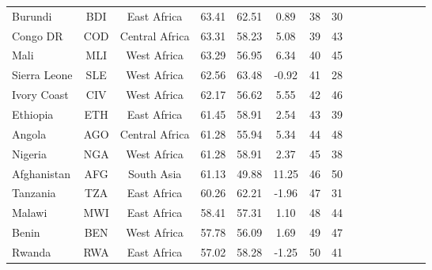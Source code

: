 {\begin{longtable}{lcccccccccccccc}
Burundi                           & BDI           & East Africa        & 63.41             & 62.51               & 0.89               & 38            & 30              \\
Congo DR & COD           & Central Africa     & 63.31             & 58.23               & 5.08               & 39            & 43              \\
Mali                              & MLI           & West Africa        & 63.29             & 56.95               & 6.34               & 40            & 45              \\
Sierra Leone                      & SLE           & West Africa        & 62.56             & 63.48               & -0.92              & 41            & 28              \\
Ivory Coast                    & CIV           & West Africa        & 62.17             & 56.62               & 5.55               & 42            & 46              \\
Ethiopia                          & ETH           & East Africa        & 61.45             & 58.91               & 2.54               & 43            & 39              \\
Angola                            & AGO           & Central Africa     & 61.28             & 55.94               & 5.34               & 44            & 48              \\
Nigeria                           & NGA           & West Africa        & 61.28             & 58.91               & 2.37               & 45            & 38              \\
Afghanistan                       & AFG           & South Asia         & 61.13             & 49.88               & 11.25              & 46            & 50              \\
Tanzania      & TZA           & East Africa        & 60.26             & 62.21               & -1.96              & 47            & 31              \\
Malawi                            & MWI           & East Africa        & 58.41             & 57.31               & 1.10               & 48            & 44              \\
Benin                             & BEN           & West Africa        & 57.78             & 56.09               & 1.69               & 49            & 47              \\
Rwanda                            & RWA           & East Africa        & 57.02             & 58.28               & -1.25              & 50            & 41              \\

\end{longtable}}
